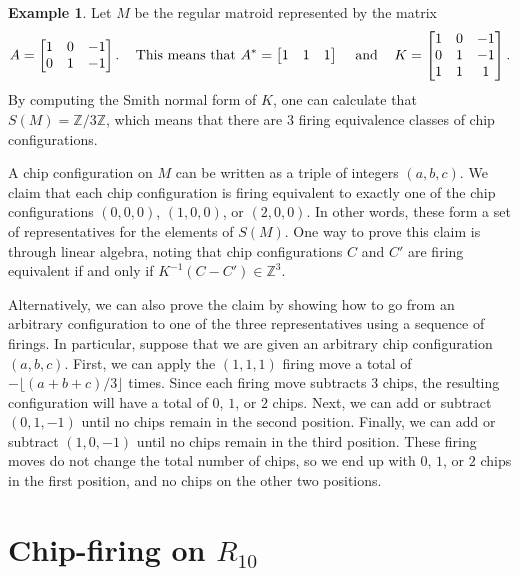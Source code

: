 \documentclass[12p]{amsart}
\numberwithin{equation}{section}
\theoremstyle{plain}
\theoremstyle{definition}
\newtheorem{example}[thm]{Example}
\newcommand{\Z}{\mathbb {Z}}
\begin{document}
\begin{example}
    Let $M$ be the regular matroid represented by the matrix 
    \[A = \begin{bmatrix} 1 & 0 & -1 \\ 0 & 1 & -1\end{bmatrix}.\hspace{ .3 cm} \text{ This means that } A^* = \begin{bmatrix} 1 & 1 & 1\end{bmatrix}\hspace{ .3 cm} \text{ and } \hspace{ .3 cm} K = \begin{bmatrix} 1 & 0 & -1 \\ 0 & 1 & -1 \\ 1 & 1 & 1\end{bmatrix}.\]
    By computing the Smith normal form of $K$, one can calculate that $S(M) = \Z/3\Z$, which means that there are 3 firing equivalence classes of chip configurations. 
    
    A chip configuration on $M$ can be written as a triple of integers $(a,b,c)$. We claim that each chip configuration is firing equivalent to exactly one of the chip configurations $(0,0,0)$, $(1,0,0)$, or $(2,0,0)$. In other words, these form a set of representatives for the elements of $S(M)$. One way to prove this claim is through linear algebra, noting that chip configurations $C$ and $C'$ are firing equivalent if and only if $K^{-1}(C-C') \in \Z^3$. 

    Alternatively, we can also prove the claim by showing how to go from an arbitrary configuration to one of the three representatives using a sequence of firings. In particular, suppose that we are given an arbitrary chip configuration $(a,b,c)$. First, we can apply the $(1,1,1)$ firing move a total of $-\lfloor(a+b+c)/3\rfloor$ times. Since each firing move subtracts 3 chips, the resulting configuration will have a total of $0$, $1$, or $2$ chips. Next, we can add or subtract $(0,1,-1)$ until no chips remain in the second position. Finally, we can add or subtract $(1,0,-1)$ until no chips remain in the third position. These firing moves do not change the total number of chips, so we end up with $0$, $1$, or $2$ chips in the first position, and no chips on the other two positions. 
\end{example}

\section{Chip-firing on $R_{10}$}\label{sec:R10} 
\end{document}
